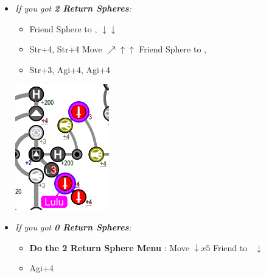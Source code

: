 \begin{spheregrid}
\begin{multicols}{2}
\begin{itemize}
\begin{itemize}
				\item \textit{If you got \textbf{2 Return Spheres}:}
				      \begin{itemize}
					      \item Friend Sphere to \lulu,  $\downarrow\downarrow$
					      \item Str+4, Str+4
					            \luluf Move $\nearrow\uparrow\uparrow$
					            \yunaf Friend Sphere to \lulu,
					      \item Str+3, Agi+4, Agi+4
				      \end{itemize}
				      \includegraphics[width=.4\columnwidth]{graphics/2_and_2}
				      \columnbreak
				\item \textit{If you got \textbf{0 Return Spheres}:}
				      \begin{itemize}
					      \item \textbf{Do the 2 Return Sphere Menu}
					            \rikkuf: Move $\downarrow x5$
					            \yunaf Friend to \rikku\ $\downarrow$
					      \item Agi+4

\end{itemize}
\end{itemize}
\end{itemize}
\end{multicols}
\end{spheregrid}
